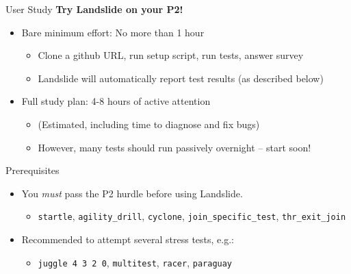 \documentclass[xcolor=dvipsnames]{beamer}
\begin{document}
\begin{frame}{User Study}
	\textbf{Try Landslide on your P2!}
	\begin{itemize}
		\item Bare minimum effort: No more than 1 hour
		\begin{itemize}
			\item Clone a github URL, run setup script, run tests, answer survey
			\item Landslide will automatically report test results (as described below)
		\end{itemize}
		\item Full study plan: 4-8 hours of active attention
		\begin{itemize}
			\item (Estimated, including time to diagnose and fix bugs)
			\item However, many tests should run passively overnight -- start soon!
		\end{itemize}
	\end{itemize}
	\pause
	\linegap

	Prerequisites
	\begin{itemize}
		\item You {\em must} pass the P2 hurdle before using Landslide.
		\begin{itemize}
			\item {\tt startle}, {\tt agility\_drill}, {\tt cyclone}, {\tt join\_specific\_test}, {\tt thr\_exit\_join}
		\end{itemize}
		\item Recommended to attempt several stress tests, e.g.:
		\begin{itemize}
			\item {\tt juggle 4 3 2 0}, {\tt multitest}, {\tt racer}, {\tt paraguay}
		\end{itemize}

	\end{itemize}
\end{frame}
\end{document}

